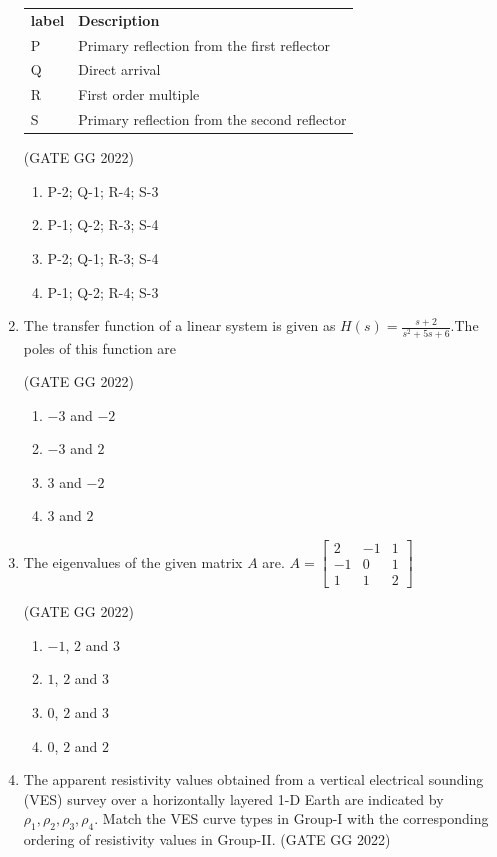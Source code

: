 \documentclass[journal]{IEEEtran}
\begin{document}
\begin{enumerate}
\begin{tabular}{ l l }
\textbf{label} & \textbf{Description} \\
P & Primary reflection from the first reflector \\
Q & Direct arrival \\
R & First order multiple \\
S & Primary reflection from the second reflector \\
\end{tabular}

\hfill(GATE GG 2022)
\begin{enumerate}
\item P-2; Q-1; R-4; S-3  
\item P-1; Q-2; R-3; S-4  
\item P-2; Q-1; R-3; S-4  
\item P-1; Q-2; R-4; S-3  
\end{enumerate}

\item The transfer function of a linear system is given as  $H(s) = \frac{s+2}{s^2+5s+6}$.The poles of this function are   \makebox[2cm]{\hrulefill}

\hfill(GATE GG 2022)
\begin{enumerate}
\item $-3$ and $-2$  
\item $-3$ and $2$  
\item $3$ and $-2$  
\item $3$ and $2$  
\end{enumerate}

\item The eigenvalues of the given matrix $A$ are.  
$A = \begin{bmatrix}
2 & -1 & 1 \\
-1 & 0 & 1 \\
1 & 1 & 2
\end{bmatrix}$

\hfill(GATE GG 2022)
\begin{enumerate}
\item $-1$, $2$ and $3$  
\item $1$, $2$ and $3$  
\item $0$, $2$ and $3$  
\item $0$, $2$ and $2$  
\end{enumerate}

\item  The apparent resistivity values obtained from a vertical electrical sounding (VES) survey over a horizontally layered 1-D Earth are indicated by $\rho_1, \rho_2, \rho_3, \rho_4$. Match the VES curve types in Group-I with the corresponding ordering of resistivity values in Group-II.  
\hfill(GATE GG 2022)\\


\end{enumerate}
\end{document}
